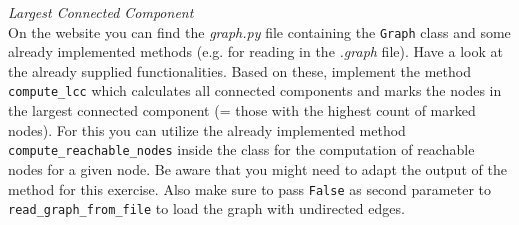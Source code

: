   \textit{Largest Connected Component}\\
On the website you can find the \emph{graph.py} file containing the \texttt{Graph}
class and some already implemented methods (e.g. for reading in the \emph{.graph}
file). Have a look at the already supplied functionalities. Based on these, implement
the method \texttt{compute\_lcc} which calculates all connected components and marks
the nodes in the largest connected component (= those with the highest count of
marked nodes). For this you can utilize the already implemented method
\texttt{compute\_reachable\_nodes} inside the class for the computation of reachable
nodes for a given node. Be aware that you might need to adapt the output of
the method for this exercise.
Also make sure to pass \texttt{False} as second parameter to \texttt{read\_graph\_from\_file} to load the graph with undirected edges.


